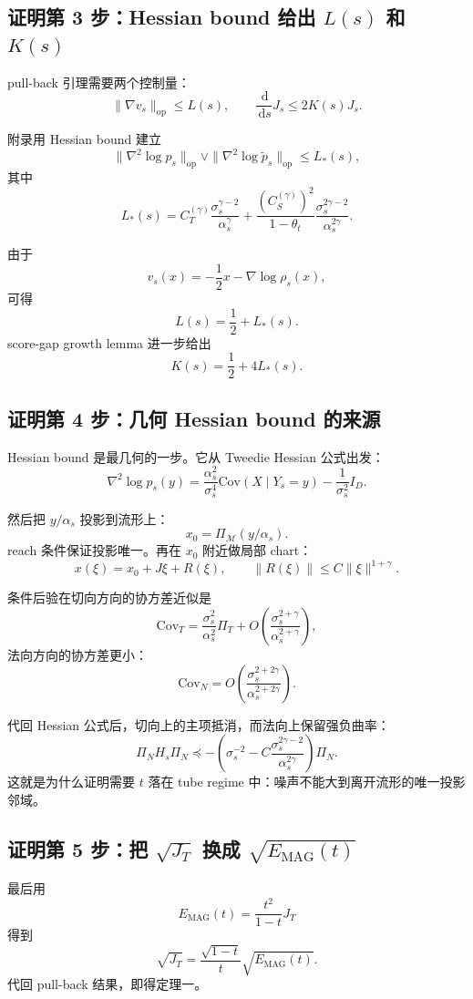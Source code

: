 \documentclass[UTF8,11pt]{ctexart}
\newcommand{\cM}{\mathcal{M}}
\newcommand{\dd}{\,\mathrm{d}}
\newcommand{\op}{\mathrm{op}}
\newcommand{\Cov}{\mathrm{Cov}}
\begin{document}
\subsection{证明第 3 步：Hessian bound 给出 \(L(s)\) 和 \(K(s)\)}

pull-back 引理需要两个控制量：
\[
\|\nabla v_s\|_{\op}\le L(s),
\qquad
\frac{\dd}{\dd s}J_s\le 2K(s)J_s.
\]

附录用 Hessian bound 建立
\[
\|\nabla^2\log p_s\|_{\op}
\vee
\|\nabla^2\log \widetilde p_s\|_{\op}
\le
L_*(s),
\]
其中
\[
L_*(s)
=
C_T^{(\gamma)}
\frac{\sigma_s^{\gamma-2}}{\alpha_s^\gamma}
+
\frac{(C_S^{(\gamma)})^2}{1-\theta_t}
\frac{\sigma_s^{2\gamma-2}}{\alpha_s^{2\gamma}}.
\]

由于
\[
v_s(x)=-\frac12x-\nabla\log\rho_s(x),
\]
可得
\[
L(s)=\frac12+L_*(s).
\]
score-gap growth lemma 进一步给出
\[
K(s)=\frac12+4L_*(s).
\]

\subsection{证明第 4 步：几何 Hessian bound 的来源}

Hessian bound 是最几何的一步。它从 Tweedie Hessian 公式出发：
\[
\nabla^2\log p_s(y)
=
\frac{\alpha_s^2}{\sigma_s^4}
\Cov(X\mid Y_s=y)
-
\frac1{\sigma_s^2}I_D.
\]

然后把 \(y/\alpha_s\) 投影到流形上：
\[
x_0=\Pi_{\cM}(y/\alpha_s).
\]
reach 条件保证投影唯一。再在 \(x_0\) 附近做局部 chart：
\[
x(\xi)
=
x_0+J\xi+R(\xi),
\qquad
\|R(\xi)\|\le C\|\xi\|^{1+\gamma}.
\]

条件后验在切向方向的协方差近似是
\[
\Cov_T
=
\frac{\sigma_s^2}{\alpha_s^2}\Pi_T
+
O\left(
\frac{\sigma_s^{2+\gamma}}{\alpha_s^{2+\gamma}}
\right),
\]
法向方向的协方差更小：
\[
\Cov_N
=
O\left(
\frac{\sigma_s^{2+2\gamma}}{\alpha_s^{2+2\gamma}}
\right).
\]

代回 Hessian 公式后，切向上的主项抵消，而法向上保留强负曲率：
\[
\Pi_NH_s\Pi_N
\preceq
-
\left(
\sigma_s^{-2}
-
C\frac{\sigma_s^{2\gamma-2}}{\alpha_s^{2\gamma}}
\right)\Pi_N.
\]
这就是为什么证明需要 \(t\) 落在 tube regime 中：噪声不能大到离开流形的唯一投影邻域。

\subsection{证明第 5 步：把 \(\sqrt{J_T}\) 换成 \(\sqrt{E_{\mathrm{MAG}}(t)}\)}

最后用
\[
E_{\mathrm{MAG}}(t)
=
\frac{t^2}{1-t}J_T
\]
得到
\[
\sqrt{J_T}
=
\frac{\sqrt{1-t}}{t}
\sqrt{E_{\mathrm{MAG}}(t)}.
\]
代回 pull-back 结果，即得定理一。
\end{document}

